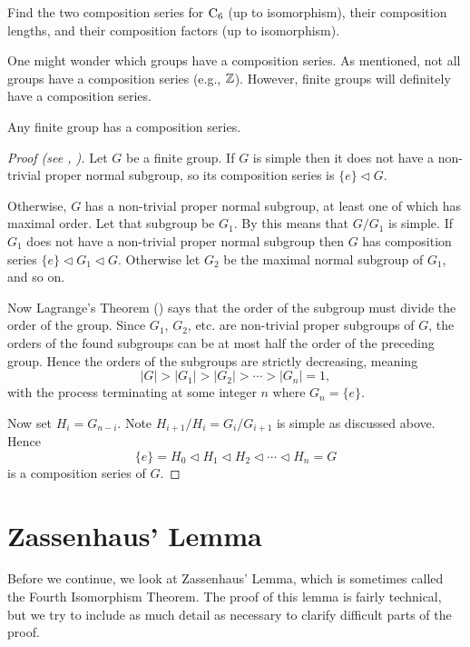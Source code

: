 \begin{exercise}
    Find the two composition series for $\mathrm{C}_{6}$ (up to isomorphism), their composition lengths, and their composition factors (up to isomorphism).
\end{exercise}

One might wonder which groups have a composition series. As mentioned, not all groups have a composition series (e.g., $\mathbb{Z}$). However, finite groups will definitely have a composition series.

\begin{theorem}\label{thrm-finite-group-has-composition-series}
    Any finite group has a composition series.
\end{theorem}
\begin{proof}[Proof (see {\cite[Theorem I.8.4]{hungerford_1980}}, \cite{proofwiki_finite-group-has-composition-series})]
    Let $G$ be a finite group. If $G$ is simple then it does not have a non-trivial proper normal subgroup, so its composition series is $\{e\} \lhd G$.

    Otherwise, $G$ has a non-trivial proper normal subgroup, at least one of which has maximal order. Let that subgroup be $G_1$. By  this means that $G/G_1$ is simple. If $G_1$ does not have a non-trivial proper normal subgroup then $G$ has composition series $\{e\} \lhd G_1 \lhd G$. Otherwise let $G_2$ be the maximal normal subgroup of $G_1$, and so on.

    Now Lagrange's Theorem () says that the order of the subgroup must divide the order of the group. Since $G_1$, $G_2$, etc. are non-trivial proper subgroups of $G$, the orders of the found subgroups can be at most half the order of the preceding group. Hence the orders of the subgroups are strictly decreasing, meaning
    \[
        |G| > |G_1| > |G_2| > \cdots > |G_n| = 1,
    \]
    with the process terminating at some integer $n$ where $G_n = \{e\}$.

    Now set $H_i = G_{n-i}$. Note $H_{i+1}/H_i = G_i/G_{i+1}$ is simple as discussed above. Hence
    \[
        \{e\} = H_0 \lhd H_1 \lhd H_2 \lhd \cdots \lhd H_n = G
    \]
    is a composition series of $G$.
\end{proof}

\section{Zassenhaus' Lemma}
Before we continue, we look at Zassenhaus' Lemma, which is sometimes called the Fourth Isomorphism Theorem. The proof of this lemma is fairly technical, but we try to include as much detail as necessary to clarify difficult parts of the proof.

